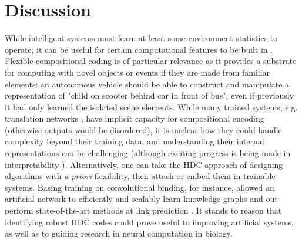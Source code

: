 \documentclass{article}
\begin{document}
\section{Discussion}

While intelligent systems must learn at least some environment statistics to operate, it can be useful for certain computational features to be built in \cite{Zador:2019}. Flexible compositional coding is of particular relevance as it provides a substrate for computing with novel objects or events if they are made from familiar elements: an autonomous vehicle should be able to construct and manipulate a representation of "child on scooter behind car in front of bus", even if previously it had only learned the isolated scene elements. While many trained systems, e.g. translation networks \cite{Bahdanau:2014, Luong:2015, Wu:2016}, have implicit capacity for compositional encoding (otherwise outputs would be disordered), it is unclear how they could handle complexity beyond their training data, and understanding their internal representations can be challenging \cite{Lipton:2016} (although exciting progress is being made in interpretability \cite{Zeiler:2014, Montavon:2018}). Alternatively, one can take the HDC approach of designing algorithms with \textit{a priori} flexibility, then attach or embed them in trainable systems. Basing training on convolutional binding, for instance, allowed an artificial network to efficiently and scalably learn knowledge graphs and out-perform state-of-the-art methods at link prediction \cite{Nickel:2016}. It stands to reason that identifying robust HDC codes could prove useful to improving artificial systems, as well as to guiding research in neural computation in biology.
\end{document}
